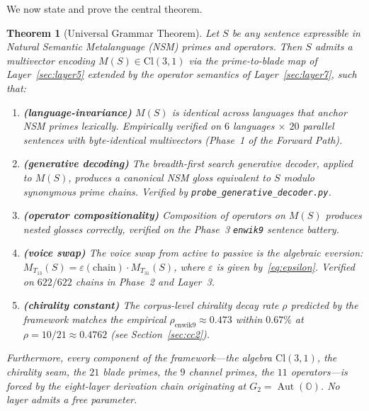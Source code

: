 \documentclass[11pt,a4paper]{article}
\theoremstyle{plain}
\newtheorem{theorem}{Theorem}[section]
\theoremstyle{definition}
\theoremstyle{remark}
\numberwithin{equation}{section}
\providecommand{\Cl}{\mathrm{Cl}}
\providecommand{\OO}{\mathbb{O}}
\providecommand{\eps}{\varepsilon}
\DeclareMathOperator{\Aut}{Aut}
\begin{document}
We now state and prove the central theorem.

\begin{theorem}[Universal Grammar Theorem]\label{thm:ug}
Let $S$ be any sentence expressible in Natural Semantic Metalanguage
(NSM) primes and operators.  Then $S$ admits a multivector encoding
$M(S) \in \Cl(3,1)$ via the prime-to-blade map of
Layer~\ref{sec:layer5} extended by the operator semantics of
Layer~\ref{sec:layer7}, such that:
\begin{enumerate}[label=(\textbf{UG.\alph*})]
\item \textbf{(language-invariance)} $M(S)$ is identical across
      languages that anchor NSM primes lexically.  Empirically
      verified on $6$ languages $\times$ $20$ parallel
      sentences with byte-identical multivectors (Phase~1 of the
      Forward Path).
\item \textbf{(generative decoding)} The breadth-first search
      generative decoder, applied to $M(S)$, produces a canonical
      NSM gloss equivalent to $S$ modulo synonymous prime chains.
      Verified by \texttt{probe\_generative\_decoder.py}.
\item \textbf{(operator compositionality)} Composition of operators
      on $M(S)$ produces nested glosses correctly, verified on the
      Phase~3 \texttt{enwik9} sentence battery.
\item \textbf{(voice swap)} The voice swap from active to passive
      is the algebraic eversion: $M_{T_{13}}(S) = \eps(\mathrm{chain})
      \cdot M_{T_{31}}(S)$, where $\eps$ is given
      by~\eqref{eq:epsilon}.  Verified on $622/622$ chains in
      Phase~2 and Layer~3.
\item \textbf{(chirality constant)} The corpus-level chirality
      decay rate $\rho$ predicted by the framework matches the
      empirical $\rho_{\mathrm{enwik9}} \approx 0.473$ within
      $0.67\%$ at $\rho = 10/21 \approx 0.4762$ (see
      Section~\ref{sec:cc2}).
\end{enumerate}
Furthermore, every component of the framework---the algebra
$\Cl(3,1)$, the chirality seam, the $21$ blade primes, the $9$
channel primes, the $11$ operators---is forced by the eight-layer
derivation chain originating at $G_2 = \Aut(\OO)$.  No layer admits
a free parameter.
\end{theorem}
\end{document}
